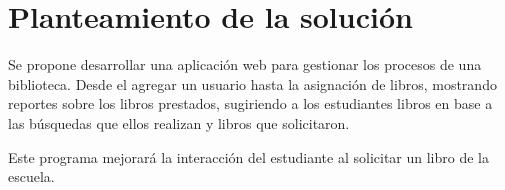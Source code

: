 \section{Planteamiento de la solución}
Se propone desarrollar una aplicación web para gestionar los procesos de una biblioteca. Desde el agregar un usuario hasta la asignación de libros, mostrando reportes sobre los libros prestados, sugiriendo a los estudiantes libros en base a las búsquedas que ellos realizan y libros que solicitaron.

Este programa mejorará la interacción del estudiante al solicitar un libro de la escuela.